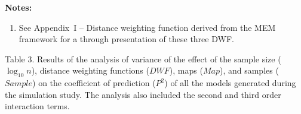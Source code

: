 \documentclass[
]{article}
\providecommand{\tightlist}{%
  \setlength{\itemsep}{0pt}\setlength{\parskip}{0pt}}
\begin{document}
\textbf{Notes:}

\begin{enumerate}
\def\labelenumi{\arabic{enumi}.}
\tightlist
\item
  See Appendix~I -- Distance weighting function derived from the MEM
  framework for a through presentation of these three DWF.
\end{enumerate}

\pagebreak

Table 3. Results of the analysis of variance of the effect of the sample
size (\(\log_{10}n\)), distance weighting functions (\(DWF\)), maps
(\(Map\)), and samples (\(Sample\)) on the coefficient of prediction
(\(P^2\)) of all the models generated during the simulation study. The
analysis also included the second and third order interaction terms.
\end{document}
